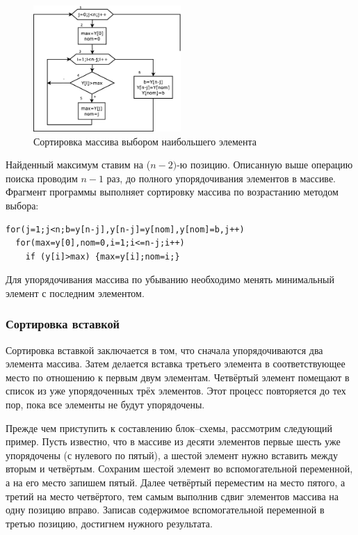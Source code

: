 \begin{figure}[htb]
\begin{center}
\includegraphics[width=0.5\textwidth]{img/ris_5_13}
\caption{Сортировка массива выбором наибольшего элемента}
\label{ch05:refDrawing12}
\end{center}
\end{figure}

Найденный максимум ставим на ($n-2)$-ю позицию. Описанную выше операцию поиска проводим
$n-1$ раз, до полного упорядочивания элементов в массиве. Фрагмент программы выполняет сортировку
массива по возрастанию методом выбора:
\begin{lstlisting}
for(j=1;j<n;b=y[n-j],y[n-j]=y[nom],y[nom]=b,j++)
  for(max=y[0],nom=0,i=1;i<=n-j;i++) 
    if (y[i]>max) {max=y[i];nom=i;}
\end{lstlisting}

Для упорядочивания массива по убыванию необходимо менять минимальный элемент с последним элементом.

\subsubsection[Сортировка вставкой]{Сортировка вставкой}
Сортировка вставкой заключается в том, что сначала упорядочиваются два элемента массива. Затем делается вставка третьего
элемента в соответствующее место по отношению к первым двум элементам. Четвёртый элемент помещают в список из уже
упорядоченных трёх элементов. Этот процесс повторяется до тех пор, пока все элементы не будут упорядочены. 

Прежде чем приступить к составлению блок–схемы, рассмотрим следующий пример. Пусть известно, что в массиве из десяти
элементов первые шесть уже упорядочены (с нулевого по пятый), а шестой элемент нужно вставить между вторым и четвёртым.
Сохраним шестой элемент во вспомогательной переменной, а на его место запишем пятый. Далее четвёртый переместим на
место пятого, а третий на место четвёртого, тем самым выполнив сдвиг элементов массива на одну позицию вправо. Записав
содержимое вспомогательной переменной в третью позицию, достигнем нужного результата.

